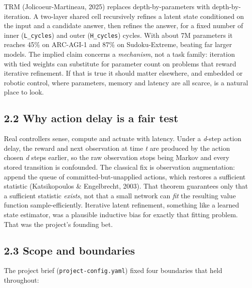 \documentclass[11pt]{article}
\begin{document}
TRM (Jolicoeur-Martineau, 2025) replaces depth-by-parameters with depth-by-iteration. A two-layer shared cell recursively refines a latent state conditioned on the input and a candidate answer, then refines the answer, for a fixed number of inner (\texttt{L\_cycles}) and outer (\texttt{H\_cycles}) cycles. With about 7M parameters it reaches 45\% on ARC-AGI-1 and 87\% on Sudoku-Extreme, beating far larger models. The implied claim concerns a \emph{mechanism}, not a task family: iteration with tied weights can substitute for parameter count on problems that reward iterative refinement. If that is true it should matter elsewhere, and embedded or robotic control, where parameters, memory and latency are all scarce, is a natural place to look.



\subsection*{2.2 Why action delay is a fair test}



Real controllers sense, compute and actuate with latency. Under a \emph{d}-step action delay, the reward and next observation at time \emph{t} are produced by the action chosen \emph{d} steps earlier, so the raw observation stops being Markov and every stored transition is confounded. The classical fix is observation augmentation: append the queue of committed-but-unapplied actions, which restores a sufficient statistic (Katsikopoulos \& Engelbrecht, 2003). That theorem guarantees only that a sufficient statistic \emph{exists}, not that a small network can \emph{fit} the resulting value function sample-efficiently. Iterative latent refinement, something like a learned state estimator, was a plausible inductive bias for exactly that fitting problem. That was the project's founding bet.



\subsection*{2.3 Scope and boundaries}



The project brief (\texttt{project-config.\allowbreak{}yaml}) fixed four boundaries that held throughout:
\end{document}
